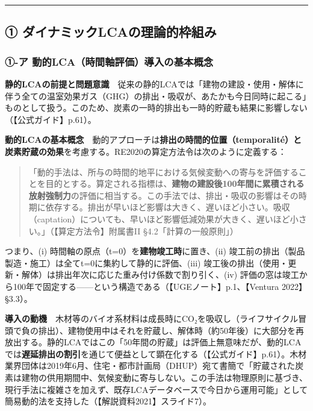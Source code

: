 \begin{center}\rule{0.5\linewidth}{0.5pt}\end{center}

\hypertarget{ux2460-ux30c0ux30a4ux30caux30dfux30c3ux30aflcaux306eux7406ux8ad6ux7684ux67a0ux7d44ux307f}{%
\subsection{①
ダイナミックLCAの理論的枠組み}\label{ux2460-ux30c0ux30a4ux30caux30dfux30c3ux30aflcaux306eux7406ux8ad6ux7684ux67a0ux7d44ux307f}}

\hypertarget{ux2460-ux30a2-ux52d5ux7684lcaux6642ux9593ux8ef8ux8a55ux4fa1ux5c0eux5165ux306eux57faux672cux6982ux5ff5}{%
\subsubsection{①-ア
動的LCA（時間軸評価）導入の基本概念}\label{ux2460-ux30a2-ux52d5ux7684lcaux6642ux9593ux8ef8ux8a55ux4fa1ux5c0eux5165ux306eux57faux672cux6982ux5ff5}}

\textbf{静的LCAの前提と問題意識}　従来の静的LCAでは「建物の建設・使用・解体に伴う全ての温室効果ガス（GHG）の排出・吸収が、あたかも今日同時に起こる」ものとして扱う。このため、炭素の一時的排出も一時的貯蔵も結果に影響しない（【公式ガイド】p.61）。

\textbf{動的LCAの基本概念}　動的アプローチは\textbf{排出の時間的位置（temporalité）と炭素貯蔵の効果}を考慮する。RE2020の算定方法令は次のように定義する：

\begin{quote}
「動的手法は、所与の時間的地平における気候変動への寄与を評価することを目的とする。算定される指標は、\textbf{建物の建設後100年間に累積される放射強制力}の評価に相当する。この手法では、排出・吸収の影響はその時期に依存する。排出が早いほど影響は大きく、遅いほど小さい。吸収（captation）についても、早いほど影響低減効果が大きく、遅いほど小さい。」（【算定方法令】附属書II
§4.2「計算の一般原則」）
\end{quote}

つまり、(i) 時間軸の原点（t=0）を\textbf{建物竣工時}に置き、(ii)
竣工前の排出（製品製造・施工）は全てt=0に集約して静的に評価、(iii)
竣工後の排出（使用・更新・解体）は排出年次に応じた重み付け係数で割り引く、(iv)
評価の窓は竣工から100年で固定する------という構造である（【UGEノート】p.1、【Ventura
2022】§3.3）。

\textbf{導入の動機}　木材等のバイオ系材料は成長時にCO₂を吸収し（ライフサイクル冒頭で負の排出）、建物使用中はそれを貯蔵し、解体時（約50年後）に大部分を再放出する。静的LCAではこの「50年間の貯蔵」は評価上無意味だが、動的LCAでは\textbf{遅延排出の割引}を通じて便益として顕在化する（【公式ガイド】p.61）。木材業界団体は2019年6月、住宅・都市計画局（DHUP）宛て書簡で「貯蔵された炭素は建物の供用期間中、気候変動に寄与しない。この手法は物理原則に基づき、現行手法に複雑さを加えず、既存LCAデータベースで今日から運用可能」として簡易動的法を支持した（【解説資料2021】スライド7）。

